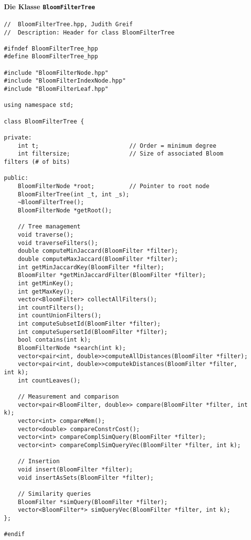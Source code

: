 \paragraph*{Die Klasse \texttt{BloomFilterTree}}
\small{
\begin{verbatim}
//  BloomFilterTree.hpp, Judith Greif
//  Description: Header for class BloomFilterTree

#ifndef BloomFilterTree_hpp
#define BloomFilterTree_hpp

#include "BloomFilterNode.hpp"
#include "BloomFilterIndexNode.hpp"
#include "BloomFilterLeaf.hpp"

using namespace std;

class BloomFilterTree {
    
private:
    int t;                          // Order = minimum degree
    int filtersize;                 // Size of associated Bloom filters (# of bits)
    
public:
    BloomFilterNode *root;          // Pointer to root node   
    BloomFilterTree(int _t, int _s);
    ~BloomFilterTree();   
    BloomFilterNode *getRoot();
    
    // Tree management
    void traverse();
    void traverseFilters();
    double computeMinJaccard(BloomFilter *filter);
    double computeMaxJaccard(BloomFilter *filter);
    int getMinJaccardKey(BloomFilter *filter);
    BloomFilter *getMinJaccardFilter(BloomFilter *filter);
    int getMinKey();
    int getMaxKey();
    vector<BloomFilter> collectAllFilters();
    int countFilters();
    int countUnionFilters(); 
    int computeSubsetId(BloomFilter *filter);
    int computeSupersetId(BloomFilter *filter);
    bool contains(int k);
    BloomFilterNode *search(int k);
    vector<pair<int, double>>computeAllDistances(BloomFilter *filter);
    vector<pair<int, double>>computekDistances(BloomFilter *filter, int k);
    int countLeaves(); 
    
    // Measurement and comparison
    vector<pair<BloomFilter, double>> compare(BloomFilter *filter, int k);
    vector<int> compareMem();
    vector<double> compareConstrCost();
    vector<int> compareComplSimQuery(BloomFilter *filter);
    vector<int> compareComplSimQueryVec(BloomFilter *filter, int k);
    
    // Insertion
    void insert(BloomFilter *filter);
    void insertAsSets(BloomFilter *filter);
    
    // Similarity queries
    BloomFilter *simQuery(BloomFilter *filter);
    vector<BloomFilter*> simQueryVec(BloomFilter *filter, int k);
};

#endif
\end{verbatim}
}
\newpage
